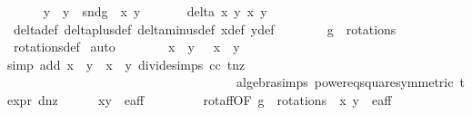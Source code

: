 \begin{isabellebody}
\ \ \ \ \isamarkupfalse%
\ y{}\ \ {\isachardoublequoteopen}y{}\ {\isacharequal}\ snd{\isacharparenleft}g{\isacharprime}\ {\isacharparenleft}{\isasymtau}\ {\isacharparenleft}x{\isacharprime}{\isacharcomma}\ y{\isacharprime}{\isacharparenright}{\isacharparenright}{\isacharparenright}{\isachardoublequoteclose}\isanewline
\ \ \ \ \isamarkupfalse%
\ {}{\isacharcolon}\ {\isachardoublequoteopen}delta\ x\ y\ x{}\ y{}\ {\isasymnoteq}\ {}{\isachardoublequoteclose}\ \isanewline
\ \ \ \ \ \ \isamarkupfalse%
\ delta{\isacharunderscore}def\ delta{\isacharunderscore}plus{\isacharunderscore}def\ delta{\isacharunderscore}minus{\isacharunderscore}def\ x{}{\isacharunderscore}def\ y{}{\isacharunderscore}def\isanewline
\ \ \ \ \ \ \isamarkupfalse%
\ {\isacartoucheopen}g{\isacharprime}\ {\isasymin}\ rotations{\isacartoucheclose}\ \isamarkupfalse%
\ rotations{\isacharunderscore}def\ \isamarkupfalse%
{\isacharparenleft}auto{\isacharparenright}\isanewline
\ \ \ \ \ \ \isamarkupfalse%
\ {\isacartoucheopen}x{\isacharprime}\ {\isacharasterisk}\ y{\isacharprime}\ {\isasymnoteq}\ {\isacharminus}\ x\ {\isacharasterisk}\ y{\isacartoucheclose}\ \isamarkupfalse%
{\isacharparenleft}simp\ add{\isacharcolon}\ {\isacartoucheopen}x{\isacharprime}\ {\isacharasterisk}\ y{\isacharprime}\ {\isasymnoteq}\ x\ {\isacharasterisk}\ y{\isacartoucheclose}\ divide{\isacharunderscore}simps\ cc\ t{\isacharunderscore}nz\ \isanewline
\ \ \ \ \ \ \ \ \ \ \ \ \ \ \ \ \ \ \ \ \ \ \ \ \ \ \ \ \ \ \ \ \ \ \ \ algebra{\isacharunderscore}simps\ power{}{\isacharunderscore}eq{\isacharunderscore}square{\isacharbrackleft}symmetric{\isacharbrackright}\ t{\isacharunderscore}expr{\isacharparenleft}{}{\isacharparenright}\ d{\isacharunderscore}nz{\isacharparenright}{\isacharplus}\isanewline
\ \ \ \ \isamarkupfalse%
\ {\isachardoublequoteopen}{\isacharparenleft}x{}{\isacharcomma}y{}{\isacharparenright}\ {\isasymin}\ e{\isacharunderscore}aff{\isachardoublequoteclose}\ \isanewline
\ \ \ \ \ \ \isamarkupfalse%
\ rot{\isacharunderscore}aff{\isacharbrackleft}OF\ {\isacartoucheopen}g{\isacharprime}\ {\isasymin}\ rotations{\isacartoucheclose}\ {\isacartoucheopen}{\isasymtau}\ {\isacharparenleft}x{\isacharprime}{\isacharcomma}\ y{\isacharprime}{\isacharparenright}\ {\isasymin}\ e{\isacharunderscore}aff{\isacartoucheclose}{\isacharbrackright}\isanewline

\end{isabellebody}
